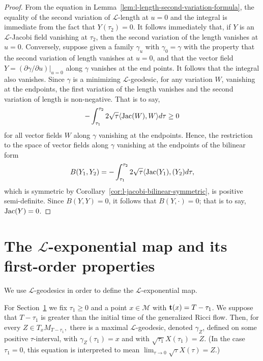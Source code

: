 \begin{proof}
\sketch
{}
From the equation in Lemma~\ref{lem:l-length-second-variation-formula}, the equality of the second variation
of ${\mathcal L}$-length at $u=0$ and the integral is immediate from the fact
that $Y(\tau_2)=0$. It follows immediately that, if  $Y$ is an ${\mathcal
L}$-Jacobi field vanishing at $\tau_2$, then the second variation of the length
vanishes at $u=0$. Conversely, suppose given a family $\gamma_u$ with
$\gamma_0=\gamma$ with the property that the second variation of length
vanishes at $u=0$, and that the vector field $Y=(\partial\gamma/\partial
u)|_{u=0}$ along $\gamma$ vanishes at the end points. It follows that the
integral also vanishes. Since $\gamma$ is a minimizing ${\mathcal L}$-geodesic,
for any variation $W$, vanishing at the endpoints, the first variation of the
length vanishes and the second variation of length is non-negative. That is to
say,
$$-\int_{\tau_1}^{\tau_2}2\sqrt{\tau}\langle \operatorname{Jac}(W),W\rangle d\tau\ge 0$$
for all vector fields $W$ along $\gamma$ vanishing at the endpoints.
Hence, the restriction to the space of vector fields along $\gamma$
vanishing at the endpoints of the bilinear form
$$B(Y_1,Y_2)=-\int_{\tau_1}^{\tau_2}2\sqrt{\tau}\langle
\operatorname{Jac}(Y_1),(Y_2)d\tau,$$ which is symmetric by Corollary~\ref{cor:l-jacobi-bilinear-symmetric}, is
positive semi-definite. Since $B(Y,Y)=0$, it follows that $B(Y,\cdot)=0$; that
is to say, $\operatorname{Jac}(Y)=0$.
\end{proof}


\section{The ${\mathcal L}$-exponential map and its first-order
properties}\label{sect:Lexp}

We use  ${\mathcal L}$-geodesics in order to define the ${\mathcal
L}$-exponential map.

For Section~\ref{sect:Lexp} we fix $\tau_1\ge 0$ and a point $x\in
{\mathcal M}$ with ${\bf t}(x)=T-\tau_1$. We suppose that $T-\tau_1$
is greater than the initial time of the generalized Ricci flow.
Then, for every $Z \in T_{x}M_{T-\tau_1},$ there is a maximal
$\mathcal{L}$-geodesic, denoted $\gamma_{Z}$, defined on some
positive $\tau$-interval, with $\gamma_{Z}(\tau_1)=x$ and with
$\sqrt{\tau_1}X(\tau_1)=Z$. (In the case $\tau_1=0$, this equation
is interpreted to mean $\lim_{\tau\rightarrow 0} \sqrt{\tau}X(\tau)
= Z$.)

